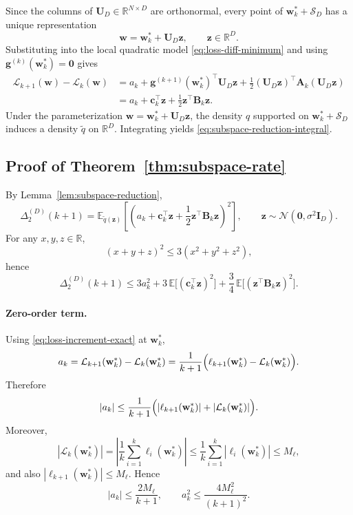 \documentclass{article}
\begin{document}
Since the columns of $\mathbf U_D\in\mathbb R^{N\times D}$ are orthonormal, every point of $\mathbf w_k^*+\mathcal S_D$ has a unique representation
\[
\mathbf w=\mathbf w_k^*+\mathbf U_D\mathbf z,
\qquad
\mathbf z\in\mathbb R^D.
\]
Substituting into the local quadratic model \eqref{eq:loss-diff-minimum} and using $\mathbf g^{(k)}(\mathbf w_k^*)=\mathbf 0$ gives
\begin{align*}
\mathcal L_{k+1}(\mathbf w)-\mathcal L_k(\mathbf w)
&=
a_k
+
\mathbf g^{(k+1)}(\mathbf w_k^*)^\top \mathbf U_D\mathbf z
+
\frac12(\mathbf U_D\mathbf z)^\top \mathbf A_k (\mathbf U_D\mathbf z)
\\
&=
a_k + \mathbf c_k^\top \mathbf z + \frac12 \mathbf z^\top \mathbf B_k \mathbf z.
\end{align*}
Under the parameterization $\mathbf w=\mathbf w_k^*+\mathbf U_D\mathbf z$, the density $q$ supported on $\mathbf w_k^*+\mathcal S_D$ induces a density $\tilde q$ on $\mathbb R^D$. Integrating yields \eqref{eq:subspace-reduction-integral}.

\subsection{Proof of Theorem~\ref{thm:subspace-rate}}

By Lemma~\ref{lem:subspace-reduction},
\[
\Delta_2^{(D)}(k+1)
=
\mathbb E_{\tilde q(\mathbf z)}
\left[
\left(
a_k+\mathbf c_k^\top\mathbf z+\frac12\mathbf z^\top\mathbf B_k\mathbf z
\right)^2
\right],
\qquad
\mathbf z\sim \mathcal N(\mathbf 0,\sigma^2\mathbf I_D).
\]
For any $x,y,z\in\mathbb R$,
\[
(x+y+z)^2\le 3(x^2+y^2+z^2),
\]
hence
\begin{equation}
\label{eq:app-thm-step1-new}
\Delta_2^{(D)}(k+1)
\le
3a_k^2
+
3\,\mathbb E\bigl[(\mathbf c_k^\top\mathbf z)^2\bigr]
+
\frac34\,\mathbb E\bigl[(\mathbf z^\top\mathbf B_k\mathbf z)^2\bigr].
\end{equation}

\paragraph{Zero-order term.}
Using \eqref{eq:loss-increment-exact} at $\mathbf w_k^*$,
\[
a_k
=
\mathcal L_{k+1}(\mathbf w_k^*)-\mathcal L_k(\mathbf w_k^*)
=
\frac{1}{k+1}\Bigl(\ell_{k+1}(\mathbf w_k^*)-\mathcal L_k(\mathbf w_k^*)\Bigr).
\]
Therefore
\[
|a_k|
\le
\frac{1}{k+1}
\Bigl(
|\ell_{k+1}(\mathbf w_k^*)|
+
|\mathcal L_k(\mathbf w_k^*)|
\Bigr).
\]
Moreover,
\[
|\mathcal L_k(\mathbf w_k^*)|
=
\left|
\frac1k\sum_{i=1}^k \ell_i(\mathbf w_k^*)
\right|
\le
\frac1k\sum_{i=1}^k |\ell_i(\mathbf w_k^*)|
\le
M_\ell,
\]
and also $|\ell_{k+1}(\mathbf w_k^*)|\le M_\ell$. Hence
\begin{equation}
\label{eq:app-ak-sq-new}
|a_k|\le \frac{2M_\ell}{k+1},
\qquad
a_k^2\le \frac{4M_\ell^2}{(k+1)^2}.
\end{equation}
\end{document}
